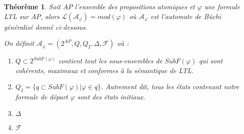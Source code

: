 \documentclass[12pt,a4paper]{article}
\theoremstyle{plain}
\newtheorem{thm}{Théorème}
\theoremstyle{definition}
\begin{document}
\begin{thm}
  Soit $AP$ l'ensemble des propositions atomiques et $\varphi$ une formule LTL sur $AP$, alors $\mathcal{L}(\mathcal{A}_\varphi) = mod(\varphi)$
  où $\mathcal{A}_\varphi$ est l'automate de Büchi généralisé donné ci-dessous.

  \noindent
  On définit $\mathcal{A}_\varphi = (2^{AP}, Q, Q_I, \Delta, \mathcal{F})$ où :
  \begin{enumerate}
  \item $Q \subset 2^{SubF(\varphi)}$ contient tout les sous-ensembles de $SubF(\varphi)$ qui sont cohérents, maximaux et conformes à la sémantique de LTL.
  \item $Q_I = \{ q \subset SubF(\varphi) | \varphi \in q \}$. Autrement dit, tous les états contenant notre formule de départ $\varphi$ sont des états initiaux.
  \item $\Delta$
  \item $\mathcal{F}$
  \end{enumerate}
\end{thm}
\end{document}
